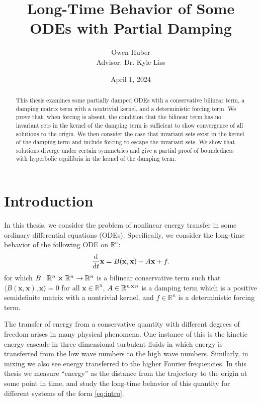 \documentclass[11pt]{article}
\title{\textbf{Long-Time Behavior of Some ODEs with Partial Damping}}
\author{Owen Huber\\[0.35 cm]{Advisor: Dr. Kyle Liss}}
\affil{Duke University}
\date{April 1, 2024}
\newcommand{\R}{\mathbb{R}}
\begin{document}
\maketitle

\begin{abstract}
    This thesis examines some partially damped ODEs with a conservative bilinear term, a damping matrix term with a nontrivial kernel, and a deterministic forcing term. We prove that, when forcing is absent, the condition that the bilinear term has no invariant sets in the kernel of the damping term is sufficient to show convergence of all solutions to the origin. We then consider the case that invariant sets exist in the kernel of the damping term and include forcing to escape the invariant sets. We show that solutions diverge under certain symmetries and give a partial proof of boundedness with hyperbolic equilibria in the kernel of the damping term. 
\end{abstract}

\tableofcontents

\section{Introduction}

In this thesis, we consider the problem of nonlinear energy transfer in some ordinary differential equations (ODEs). Specifically, we consider the long-time behavior of the following ODE on $\R^n$: 
\begin{equation}\label{eq:intro}
    \dv{}{t}\mathbf{x} = B(\mathbf{x}, \mathbf{x}) - A\mathbf{x} + f.
\end{equation}
for which $B: \R^n \cross \R^n \rightarrow \R^n$ is a bilinear conservative term such that $\langle B(\mathbf{x}, \mathbf{x}), \mathbf{x} \rangle = 0$ for all $\mathbf{x} \in \R^n$, $A \in \R^{n \cross n}$ is a damping term which is a positive semidefinite matrix with a nontrivial kernel, and $f \in \R^n$ is a deterministic forcing term. 

The transfer of energy from a conservative quantity with different degrees of freedom arises in many physical phenomena. One instance of this is the kinetic energy cascade in three dimensional turbulent fluids in which energy is transferred from the low wave numbers to the high wave numbers. Similarly, in mixing we also see energy transferred to the higher Fourier frequencies. In this thesis we measure ``energy'' as the distance from the trajectory to the origin at some point in time, and study the long-time behavior of this quantity for different systems of the form \eqref{eq:intro}. 
\end{document}
